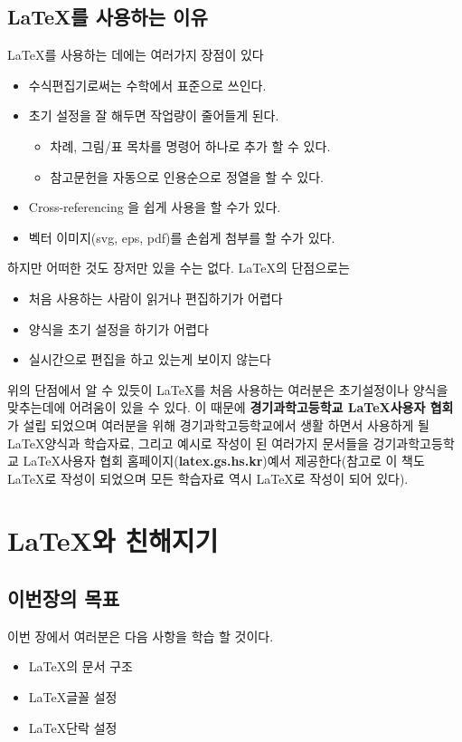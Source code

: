 \documentclass[12pt]{article}
\begin{document}
	\subsection{\LaTeX 를 사용하는 이유}
	\LaTeX 를 사용하는 데에는 여러가지 장점이 있다
	\begin{itemize}
		\item 수식편집기로써는 수학에서 표준으로 쓰인다.
		\item 초기 설정을 잘 해두면 작업량이 줄어들게 된다.
		\begin{itemize}
			\item 차례, 그림/표 목차를 명령어 하나로 추가 할 수 있다.
			\item 참고문헌을 자동으로 인용순으로 정열을 할 수 있다.
		\end{itemize}
		\item Cross-referencing 을 쉽게 사용을 할 수가 있다.
		\item 벡터 이미지(svg, eps, pdf)를 손쉽게 첨부를 할 수가 있다.
	\end{itemize}
	하지만 어떠한 것도 장저만 있을 수는 없다. \LaTeX 의 단점으로는
	\begin{itemize}
		\item 처음 사용하는 사람이 읽거나 편집하기가 어렵다
		\item 양식을 초기 설정을 하기가 어렵다
		\item 실시간으로 편집을 하고 있는게 보이지 않는다
	\end{itemize}
	위의 단점에서 알 수 있듯이 \LaTeX 를 처음 사용하는 여러분은 초기설정이나 양식을 맞추는데에 어려움이 있을 수 있다. 이 때문에 {\bf 경기과학고등학교 \LaTeX 사용자 협회}가 설립 되었으며  여러분을 위해 경기과학고등학교에서 생활 하면서 사용하게 될 \LaTeX 양식과 학습자료, 그리고 예시로 작성이 된 여러가지 문서들을 겅기과학고등학교 \LaTeX 사용자 협회 홈페이지({\bf latex.gs.hs.kr})예서 제공한다(참고로 이 책도 \LaTeX 로 작성이 되었으며 모든 학습자료 역시 \LaTeX 로 작성이 되어 있다).
	\clearpage
	
	\section{\LaTeX 와 친해지기}
	\subsection{이번장의 목표}
	이번 장에서 여러분은 다음 사항을 학습 할 것이다.
	\begin{itemize}
		\item \LaTeX 의 문서 구조
		\item \LaTeX 글꼴 설정
		\item \LaTeX 단락 설정
	\end{itemize}
\end{document}
